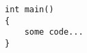 \begin{lstlisting}[style=CStyle, basicstyle=\small, caption=Код, label={lst:code}]
int main()
{
	some code...
}
\end{lstlisting}